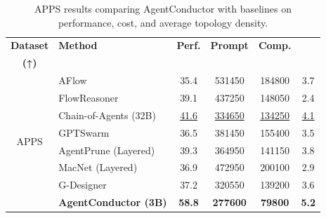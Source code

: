 \documentclass{article}
\theoremstyle{definition}
\begin{document}
\begin{table}[!t] %
\centering        %
\caption{APPS results comparing AgentConductor with baselines on performance, cost, and average topology density.} %
\vspace{-0.4em}   %
\label{tab:costs_and_topos} %

\setlength{\tabcolsep}{1.2pt} %
\renewcommand{\arraystretch}{1.2} %
\footnotesize   %

\begin{tabular}{c|p{2.9cm}cccc} %
\toprule
\textbf{Dataset} & \textbf{Method} & \textbf{Perf.} & \textbf{Prompt} & \textbf{Comp.} &
\makecell{\textbf{$\mathcal{S}_{\text{complex}}$}\\\textbf{(↑)}} \\
\midrule
\multirow{8}{*}{APPS}
& AFlow & 35.4 & 531450 & 184800 & 3.7 \\
& FlowReasoner & 39.1 & 437250 & 148050 & 2.4 \\
& Chain-of-Agents (32B) & \underline{41.6} & \underline{334650} & \underline{134250} & \underline{4.1} \\
\cmidrule(lr){2-6}
& GPTSwarm & 36.5 & 381450 & 155400 & 3.5 \\
& AgentPrune (Layered) & 39.3 & 364950 & 141150 & 3.8 \\
& MacNet (Layered) & 36.9 & 472950 & 200100 & 2.9 \\
& G-Designer & 37.2 & 320550 & 139200 & 3.6 \\
& \cellcolor[RGB]{220,235,245}\textbf{AgentConductor (3B)}
& \cellcolor[RGB]{220,235,245}\textbf{58.8}
& \cellcolor[RGB]{220,235,245}\textbf{277600}
& \cellcolor[RGB]{220,235,245}\textbf{79800}
& \cellcolor[RGB]{220,235,245}\textbf{5.2} \\
\bottomrule
\end{tabular}

\vspace{-0.8em}
\end{table}
\end{document}
